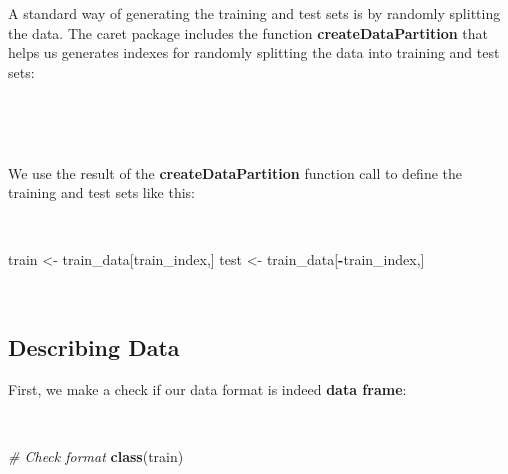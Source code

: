 \documentclass[
  10pt,
  a4paper]{article}
\newenvironment{Shaded}{\begin{snugshade}}{\end{snugshade}}
\newcommand{\CommentTok}[1]{\textcolor[rgb]{0.56,0.35,0.01}{\textit{#1}}}
\newcommand{\DataTypeTok}[1]{\textcolor[rgb]{0.13,0.29,0.53}{#1}}
\newcommand{\DecValTok}[1]{\textcolor[rgb]{0.00,0.00,0.81}{#1}}
\newcommand{\FloatTok}[1]{\textcolor[rgb]{0.00,0.00,0.81}{#1}}
\newcommand{\KeywordTok}[1]{\textcolor[rgb]{0.13,0.29,0.53}{\textbf{#1}}}
\newcommand{\NormalTok}[1]{#1}
\newcommand{\OperatorTok}[1]{\textcolor[rgb]{0.81,0.36,0.00}{\textbf{#1}}}
\newcommand{\OtherTok}[1]{\textcolor[rgb]{0.56,0.35,0.01}{#1}}
\newcommand{\StringTok}[1]{\textcolor[rgb]{0.31,0.60,0.02}{#1}}
\begin{document}
A standard way of generating the training and test sets is by randomly
splitting the data. The caret package includes the function
\textbf{createDataPartition} that helps us generates indexes for
randomly splitting the data into training and test sets:

~

\begin{Shaded}
\end{Shaded}

~

We use the result of the \textbf{createDataPartition} function call to
define the training and test sets like this:

~

\begin{Shaded}
\begin{Highlighting}[]
\NormalTok{train <-}\StringTok{ }\NormalTok{train_data[train_index,]}
\NormalTok{test <-}\StringTok{ }\NormalTok{train_data[}\OperatorTok{-}\NormalTok{train_index,]}
\end{Highlighting}
\end{Shaded}

~

\hypertarget{describing-data}{%
\subsection{Describing Data}\label{describing-data}}

First, we make a check if our data format is indeed \textbf{data frame}:

~

\begin{Shaded}
\begin{Highlighting}[]
\CommentTok{# Check format}
\KeywordTok{class}\NormalTok{(train)}
\end{Highlighting}
\end{Shaded}
\end{document}

